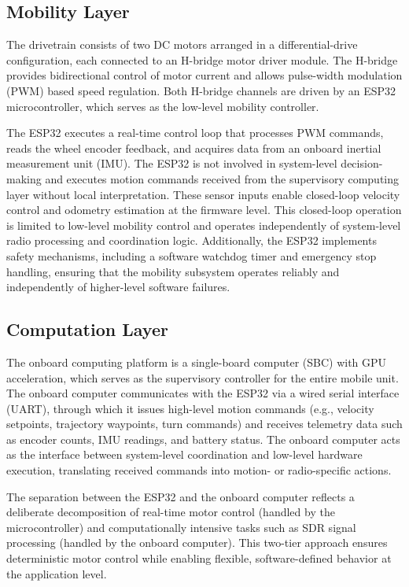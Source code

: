\documentclass[conference,a4paper]{IEEEtran}
\begin{document}
\subsection{Mobility Layer}
The drivetrain consists of two DC motors arranged in a differential-drive configuration, each connected to an H-bridge motor driver module. The H-bridge provides bidirectional control of motor current and allows pulse-width modulation (PWM) based speed regulation. Both H-bridge channels are driven by an ESP32 microcontroller, which serves as the low-level mobility controller.

The ESP32 executes a real-time control loop that processes PWM commands, reads the wheel encoder feedback, and acquires data from an onboard inertial measurement unit (IMU). The ESP32 is not involved in system-level decision-making and executes motion commands
received from the supervisory computing layer without local interpretation. These sensor inputs enable closed-loop velocity control and odometry estimation at the firmware level. This closed-loop operation is limited to low-level mobility control and operates independently of system-level radio processing and coordination logic. Additionally, the ESP32 implements safety mechanisms, including a software watchdog timer and emergency stop handling, ensuring that the mobility subsystem operates reliably and independently of higher-level software failures.

\subsection{Computation Layer}
The onboard computing platform is a single-board computer (SBC) with GPU acceleration, which serves as the supervisory controller for the entire mobile unit. The onboard computer communicates with the ESP32 via a wired serial interface (UART), through which it issues high-level motion commands (e.g., velocity setpoints, trajectory waypoints, turn commands) and receives telemetry data such as encoder counts, IMU readings, and battery status. The onboard computer acts as the interface between system-level coordination and low-level hardware execution, translating received commands into motion- or radio-specific actions.


The separation between the ESP32 and the onboard computer reflects a deliberate decomposition of real-time motor control (handled by the microcontroller) and computationally intensive tasks such as SDR signal processing (handled by the onboard computer). This two-tier approach ensures deterministic motor control while enabling flexible, software-defined behavior at the application level.
\end{document}
